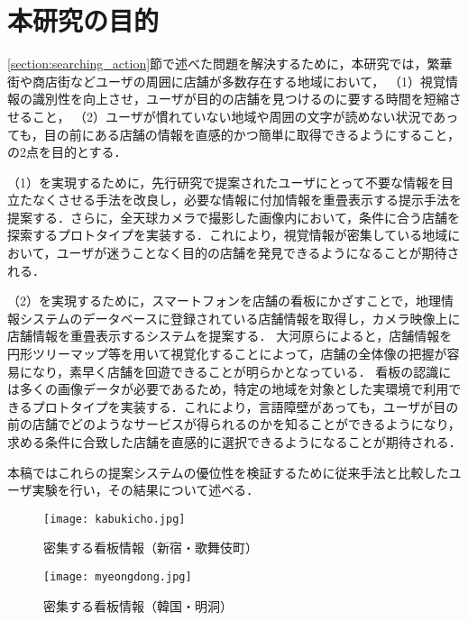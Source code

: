 \section{本研究の目的}
\label{section:purpose}
  \ref{section:searching_action}節で述べた問題を解決するために，本研究では，繁華街や商店街などユーザの周囲に店舗が多数存在する地域において，
  （1）視覚情報の識別性を向上させ，ユーザが目的の店舗を見つけるのに要する時間を短縮させること，
  （2）ユーザが慣れていない地域や周囲の文字が読めない状況であっても，目の前にある店舗の情報を直感的かつ簡単に取得できるようにすること，の2点を目的とする．

  （1）を実現するために，先行研究\cite{Fujita:2013}で提案されたユーザにとって不要な情報を目立たなくさせる手法を改良し，必要な情報に付加情報を重畳表示する提示手法を提案する．さらに，全天球カメラで撮影した画像内において，条件に合う店舗を探索するプロトタイプを実装する．これにより，視覚情報が密集している地域において，ユーザが迷うことなく目的の店舗を発見できるようになることが期待される．

  （2）を実現するために，スマートフォンを店舗の看板にかざすことで，地理情報システムのデータベースに登録されている店舗情報を取得し，カメラ映像上に店舗情報を重畳表示するシステムを提案する．
  大河原らによると，店舗情報を円形ツリーマップ等を用いて視覚化することによって，店舗の全体像の把握が容易になり，素早く店舗を回遊できることが明らかとなっている\cite{Ookawara:2015}．
  看板の認識には多くの画像データが必要であるため，特定の地域を対象とした実環境で利用できるプロトタイプを実装する．これにより，言語障壁があっても，ユーザが目の前の店舗でどのようなサービスが得られるのかを知ることができるようになり，求める条件に合致した店舗を直感的に選択できるようになることが期待される．

  本稿ではこれらの提案システムの優位性を検証するために従来手法と比較したユーザ実験を行い，その結果について述べる．

  \begin{figure}[tb]
    \centerline{\texttt{[image: kabukicho.jpg]}}
    \caption{密集する看板情報（新宿・歌舞伎町）}
    \label{figure:kabukicho}
    \vspace{1cm}
    \centerline{\texttt{[image: myeongdong.jpg]}}
    \caption{密集する看板情報（韓国・明洞）}
    \label{figure:myeongdong}
  \end{figure}
